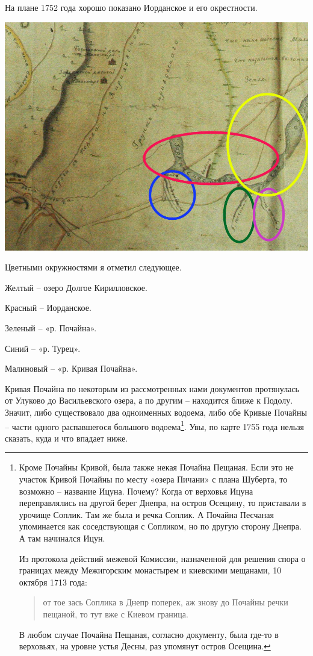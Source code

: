 На плане 1752 года хорошо показано Иорданское и его окрестности.

\begin{center}
\includegraphics[width=\linewidth]{chast-colebanie-osnov/pochayna/1752-chern.jpg}
\end{center}

Цветными окружностями я отметил следующее.

Желтый – озеро Долгое Кирилловское. 

Красный – Иорданское. 

Зеленый – «р. Почайна». 

Синий – «р. Турец». 

Малиновый – «р. Кривая Почайна».

Кривая Почайна по некоторым из рассмотренных нами документов протянулась от Улуково до Васильевского озера, а по другим – находится ближе к Подолу. Значит, либо существовало два одноименных водоема, либо обе Кривые Почайны – части одного распавшегося большого водоема\footnote{Кроме Почайны Кривой, была также некая Почайна Пещаная. Если это не участок Кривой Почайны по месту «озера Пичани» с плана Шуберта, то возможно – название Ицуна. Почему? Когда от верховья Ицуна переправлялись на другой берег Днепра, на остров Осещину, то приставали в урочище Соплик. Там же была и речка Соплик. А Почайна Песчаная упоминается как соседствующая с Сопликом, но по другую сторону Днепра. А там начинался Ицун.

Из протокола действий межевой Комиссии, назначенной для решения спора о границах между Межигорским монастырем и киевскими мещанами, 10 октября 1713 года:

\begin{quotation}
от тое зась Соплика в Днепр поперек, аж знову до Почайны речки пещаной, то тут вже с Киевом граница.
\end{quotation}

В любом случае Почайна Пещаная, согласно документу, была где-то в верховьях, на уровне устья Десны, раз упомянут остров Осещина.}. Увы, по карте 1755 года нельзя сказать, куда и что впадает ниже.


